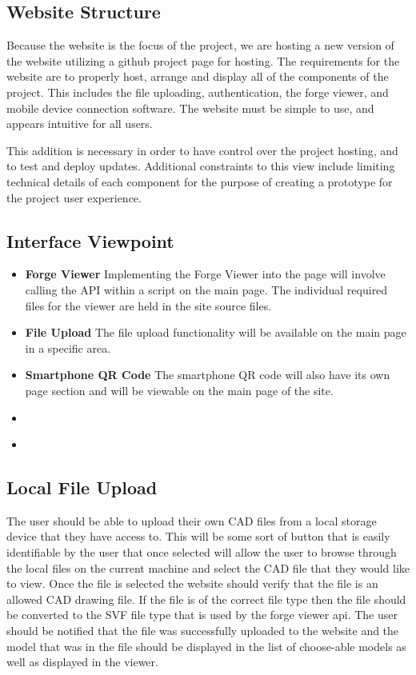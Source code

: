 \documentclass[letterpaper, 10pt, draftclsnofoot, compsoc, onecolumn]{IEEEtran}
\begin{document}
\subsection{Website Structure}
Because the website is the focus of the project, we are hosting a new version of the website utilizing a github project page for hosting. The requirements for the website are to properly host, arrange and display all of the components of the project. This includes the file uploading, authentication, the forge viewer, and mobile device connection software. The website must be simple to use, and appears intuitive for all users.

This addition is necessary in order to have control over the project hosting, and to test and deploy updates. Additional constraints to this view include limiting technical details of each component for the purpose of creating a prototype for the project user experience. 
\subsection{Interface Viewpoint}
\begin{itemize}
	\item[]\textbf{Forge Viewer} Implementing the Forge Viewer into the page will involve calling the API within a script on the main page. The individual required files for the viewer are held in the site source files.
	\item[]\textbf{File Upload} The file upload functionality will be available on the main page in a specific area.
	\item[]\textbf{Smartphone QR Code}  The smartphone QR code will also have its own page section and will be viewable on the main page of the site.
	\item[]\textbf{}
	\item[]\textbf{} 
\end{itemize}


\subsection{Local File Upload}
	The user should be able to upload their own CAD files from a local storage device that they have access to. This will be some sort of button that is easily identifiable by the user that once selected will allow the user to browse through the local files on the current machine and select the CAD file that they would like to view. Once the file is selected the website should verify that the file is an allowed CAD drawing file. If the file is of the correct file type then the file should be converted to the SVF file type that is used by the forge viewer api. The user should be notified that the file was successfully uploaded to the website and the model that was in the file should be displayed in the list of choose-able models as well as displayed in the viewer. 
\end{document}
